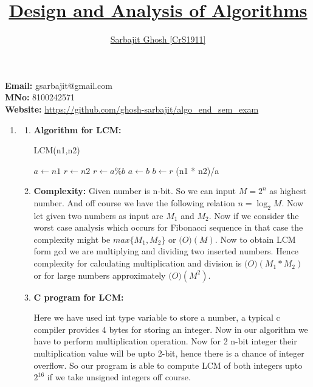 \documentclass[12pt,a4paper,final]{article}
\title{\underline{Design and Analysis of Algorithms}}
\author{\underline {Sarbajit Ghosh [CrS1911]}}
\theoremstyle{definition}
\begin{document}
\maketitle



\begin{center}
\textbf{Email: }gsarbajit@gmail.com\\
\textbf{MNo: }8100242571\\
\textbf{Website: }\url{https://github.com/ghosh-sarbajit/algo_end_sem_exam}
\end{center}

\begin{enumerate}

\item
\begin{enumerate}
\item
\textbf{Algorithm for LCM: }
\begin{algorithm}[H]
\caption{LCM(n1,n2)}
\begin{algorithmic}[1]
\State $a \gets n1$
\State $r \gets n2$
	\State $r \gets a\%b$
	\State $a \gets b$
	\State $b \gets r$
\EndWhile
\State \Return (n1 * n2)/a
\end{algorithmic}
\end{algorithm}

\item
\textbf{Complexity: }Given number is n-bit. So we can input $M=2^n$ as highest number. And off course we have the following relation $n=\log_2 M$. Now let given two numbers as input are $M_1$ and $M_2$. Now if we consider the worst case analysis which occurs for Fibonacci sequence in that case the complexity might be $max\{M_1,M_2\}$ or $\mathcal(O)(M)$. Now to obtain LCM form gcd we are multiplying and dividing two inserted numbers. Hence complexity for calculating multiplication and division is $\mathcal(O)(M_1*M_2)$ or for large numbers approximately $\mathcal(O)(M^2)$.
 

\item
\textbf{C program for LCM: }


Here we have used int type variable to store a number, a typical c compiler provides 4 bytes for storing an integer. Now in our algorithm we have to perform multiplication operation. Now for 2 n-bit integer their multiplication value will be upto 2-bit, hence there is a chance of integer overflow. So our program is able to compute LCM of both integers upto $2^16$ if we take unsigned integers off course.


\end{enumerate}
\end{enumerate}
\end{document}
